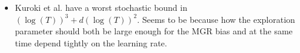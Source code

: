\documentclass{article}
\theoremstyle{plain}
\theoremstyle{definition}
\theoremstyle{remark}
\begin{document}
\begin{itemize}
    \item Kuroki et al. have a worst stochastic bound in $(\log(T))^3+d(\log(T))^2$. Seems to be because how the exploration parameter should both be large enough for the MGR bias and at the same time depend tightly on the learning rate.
\end{itemize}


\clearpage

\clearpage

\clearpage

\clearpage

\end{document}
